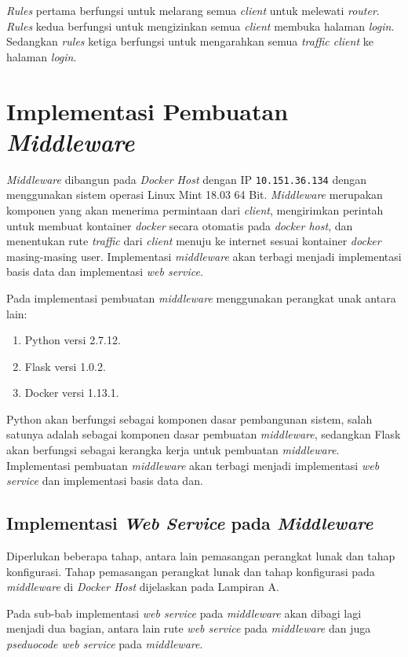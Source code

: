 \indent \textit{Rules} pertama berfungsi untuk melarang semua \textit{client} untuk melewati \textit{router}. \textit{Rules} kedua berfungsi untuk mengizinkan semua \textit{client} membuka halaman \textit{login}. Sedangkan \textit{rules} ketiga berfungsi untuk mengarahkan semua \textit{traffic client} ke halaman \textit{login}.

\section{Implementasi Pembuatan \textit{Middleware}}
\textit{Middleware} dibangun pada \textit{Docker Host} dengan IP \texttt{10.151.36.134} dengan menggunakan sistem operasi Linux Mint 18.03 64 Bit. \textit{Middleware} merupakan komponen yang akan menerima permintaan dari \textit{client}, mengirimkan perintah untuk membuat kontainer \textit{docker} secara otomatis pada \textit{docker host}, dan menentukan rute \textit{traffic} dari \textit{client} menuju ke internet sesuai kontainer \textit{docker} masing-masing user. Implementasi \textit{middleware} akan terbagi menjadi implementasi basis data dan implementasi \textit{web service}.

Pada implementasi pembuatan \textit{middleware} menggunakan perangkat unak antara lain:
\begin{enumerate}
	\item Python versi 2.7.12.
	\item Flask versi 1.0.2.
	\item Docker versi 1.13.1.
\end{enumerate}

Python akan berfungsi sebagai komponen dasar pembangunan sistem, salah satunya adalah sebagai komponen dasar pembuatan \textit{middleware}, sedangkan Flask akan berfungsi sebagai kerangka kerja untuk pembuatan \textit{middleware}. Implementasi pembuatan \textit{middleware} akan terbagi menjadi implementasi \textit{web service} dan implementasi basis data dan.

\subsection{Implementasi \textit{Web Service} pada \textit{Middleware}}
Diperlukan beberapa tahap, antara lain pemasangan perangkat lunak dan tahap konfigurasi. Tahap pemasangan perangkat lunak dan tahap konfigurasi pada \textit{middleware} di \textit{Docker Host} dijelaskan pada Lampiran A.

Pada sub-bab implementasi \textit{web service} pada \textit{middleware} akan dibagi lagi menjadi dua bagian, antara lain rute \textit{web service} pada \textit{middleware} dan juga \textit{pseduocode web service} pada \textit{middleware}.

